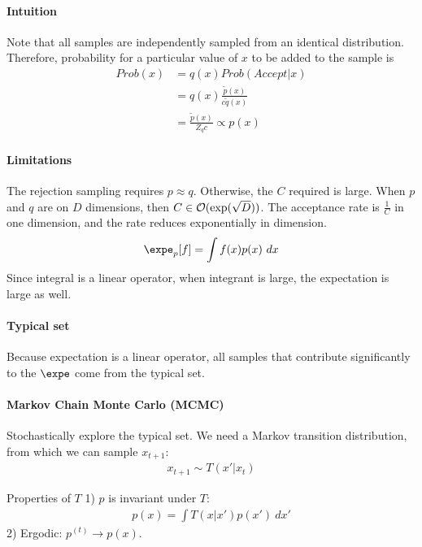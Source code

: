 \documentclass{article}
\begin{document}
	\paragraph{Intuition} Note that all samples are independently sampled from an identical distribution. Therefore, probability for a particular value of $x$ to be added to the sample is
	\begin{align}
		Prob(x) &= q(x) Prob(Accept|x) \\
		&= q(x) \frac{\tilde{p}(x)}{c \tilde{q}(x)} \\
		&= \frac{\tilde{p}(x)}{Z_q c} \propto p(x)
	\end{align}
	
	\paragraph{Limitations} The rejection sampling requires $p \approx q$. Otherwise, the $C$ required is large. When $p$ and $q$ are on $D$ dimensions, then $C \in \mathcal{{O}}(\exp(\sqrt{D}))$. The acceptance rate is $\frac{1}{C}$ in one dimension, and the rate reduces exponentially in dimension.
	\begin{align}
		\expe_p [f] = \int f(x) p(x)\ dx
	\end{align}
	Since integral is a linear operator, when integrant is large, the expectation is large as well.
	
	\paragraph{Typical set} Because expectation is a linear operator, all samples that contribute significantly to the $\expe$ come from the typical set. 

	\paragraph{Markov Chain Monte Carlo (MCMC)} Stochastically explore the typical set. We need a Markov transition distribution, from which we can sample $x_{t+1}$:
	\begin{align}
		x_{t+1} \sim T(x'|x_t)
	\end{align}
	\begin{proposition} Properties of $T$
		1) $p$ is invariant under $T$:
		\begin{align}
			p(x) = \int T(x|x') p(x')\ dx'
		\end{align}
		2) Ergodic: $p^{(t)} \to p(x)$.
	\end{proposition}
	
\end{document}
